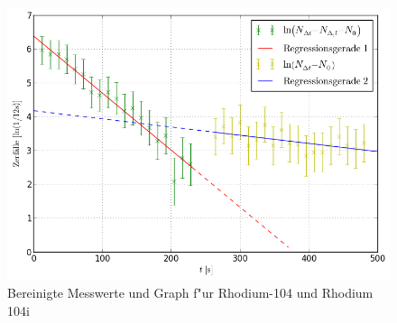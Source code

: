 		\enlargethispage{5cm}

		\begin{figure}[!h]
			\centering
			\includegraphics[width = 14cm]{img/graph_rhodium_linearisiert.png}
			\caption{Bereinigte Messwerte und Graph f"ur Rhodium-104 und Rhodium 104i}
			\label{fig:the_label}
		\end{figure}

		\clearpage
